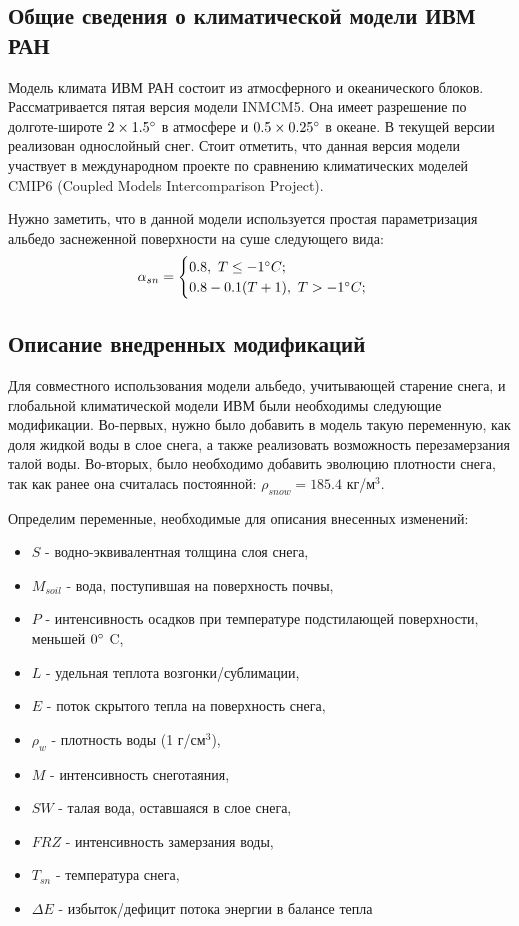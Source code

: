 \documentclass[a4paper, fontsize=14pt]{scrartcl}
\begin{document}
\subsection{Общие сведения о климатической модели ИВМ РАН}

Модель климата ИВМ РАН \cite{Volodin2017} состоит из атмосферного и океанического блоков. Рассматривается пятая версия модели INMCM5. Она имеет разрешение по долготе-широте $2 \times 1.5\degree$ в атмосфере и $0.5 \times 0.25\degree$ в океане. В текущей версии реализован однослойный снег. Стоит отметить, что данная версия модели участвует в международном проекте по сравнению климатических моделей CMIP6 (Coupled Models Intercomparison Project).

Нужно заметить, что в данной модели используется простая параметризация альбедо заснеженной поверхности на суше следующего вида:
\begin{equation}
    \alpha_{sn} = \begin{cases}
                        0.8,~ T \leq -1 \degree C; \\
                        0.8 - 0.1(T + 1), ~T > -1 \degree C;
                  \end{cases} \label{sys}
\end{equation}


\subsection{Описание внедренных модификаций}

Для совместного использования модели альбедо, учитывающей старение снега, и глобальной климатической модели ИВМ были необходимы следующие модификации. Во-первых, нужно было добавить в модель такую переменную, как доля жидкой воды в слое снега, а также реализовать возможность перезамерзания талой воды. Во-вторых, было необходимо добавить эволюцию плотности снега, так как ранее она считалась постоянной: $\rho_{snow} = 185.4 $ кг/м$^3$.

Определим переменные, необходимые для описания внесенных изменений: 
\begin{itemize}
    \item $S$ - водно-эквивалентная толщина слоя снега,
    \item $M_{soil}$ - вода, поступившая на поверхность почвы,
    \item $P$ - интенсивность осадков при температуре подстилающей поверхности, меньшей $0\degree $ C,
    \item $L$ - удельная теплота возгонки/сублимации, 
    \item $E$ - поток скрытого тепла на поверхность снега,
    \item $\rho_w$ - плотность воды (1 г/см$^3$),
    \item $M$ - интенсивность снеготаяния,
    \item $SW$ - талая вода, оставшаяся в слое снега,
    \item $FRZ$ - интенсивность замерзания воды, 
    \item $T_{sn}$ - температура снега, 
    \item $\Delta E$ - избыток/дефицит потока энергии в балансе тепла
\end{itemize}
\end{document}
